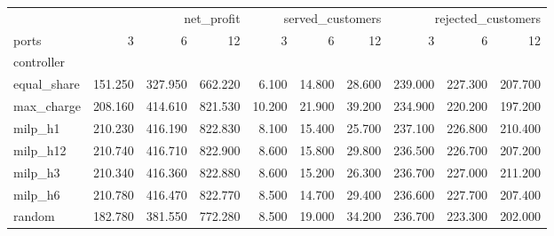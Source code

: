 \begin{tabular}{lrrrrrrrrr}
\toprule
 & \multicolumn{3}{r}{net_profit} & \multicolumn{3}{r}{served_customers} & \multicolumn{3}{r}{rejected_customers} \\
ports & 3 & 6 & 12 & 3 & 6 & 12 & 3 & 6 & 12 \\
controller &  &  &  &  &  &  &  &  &  \\
\midrule
equal_share & 151.250 & 327.950 & 662.220 & 6.100 & 14.800 & 28.600 & 239.000 & 227.300 & 207.700 \\
max_charge & 208.160 & 414.610 & 821.530 & 10.200 & 21.900 & 39.200 & 234.900 & 220.200 & 197.200 \\
milp_h1 & 210.230 & 416.190 & 822.830 & 8.100 & 15.400 & 25.700 & 237.100 & 226.800 & 210.400 \\
milp_h12 & 210.740 & 416.710 & 822.900 & 8.600 & 15.800 & 29.800 & 236.500 & 226.700 & 207.200 \\
milp_h3 & 210.340 & 416.360 & 822.880 & 8.600 & 15.200 & 26.300 & 236.700 & 227.000 & 211.200 \\
milp_h6 & 210.780 & 416.470 & 822.770 & 8.500 & 14.700 & 29.400 & 236.600 & 227.700 & 207.400 \\
random & 182.780 & 381.550 & 772.280 & 8.500 & 19.000 & 34.200 & 236.700 & 223.300 & 202.000 \\
\bottomrule
\end{tabular}
